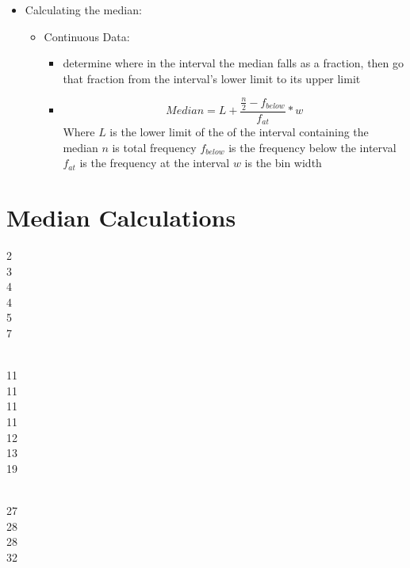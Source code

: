 \documentclass[12pt]{article}
\begin{document}
\begin{itemize}
\itemsep1pt\parskip0pt
\item
  Calculating the median:

  \begin{itemize}
  \itemsep1pt\parskip0pt
  \item
    Continuous Data:

    \begin{itemize}
    \itemsep1pt\parskip0pt
    \item
      determine where in the interval the median falls as a fraction,
      then go that fraction from the interval's lower limit to its upper
      limit
    \item
      \[ Median = L + \frac{ \frac{n}{2} - f_{below}}{f_{at}} * w \]
      Where \(L\) is the lower limit of the of the interval containing
      the median \(n\) is total frequency \(f_{below}\) is the frequency
      below the interval \(f_{at}\) is the frequency at the interval
      \(w\) is the bin width
    \end{itemize}
  \end{itemize}
\end{itemize}

\section{Median Calculations}\label{median-calculations}
\begin{multicols}{3}
2\\3\\4\\4\\5\\7

\\11\\11\\11\\11\\12\\13\\19

\\27\\28\\28\\32

\end{multicols}
\end{document}
